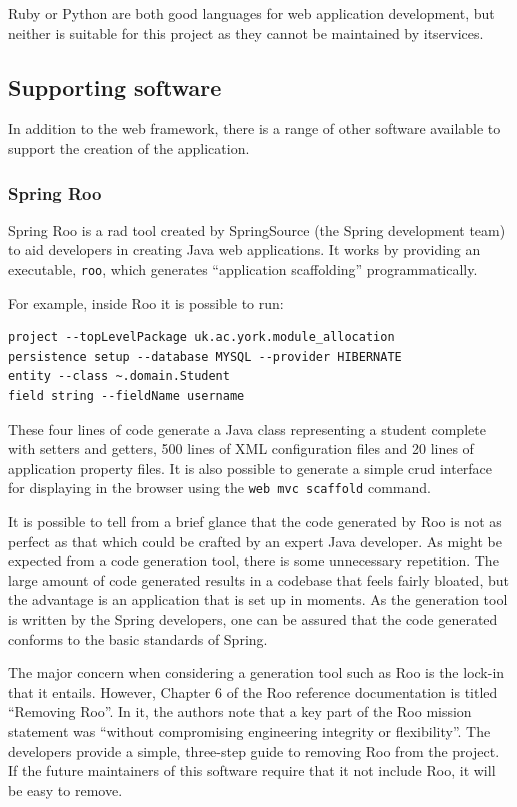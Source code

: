 \documentclass[twoside,draft]{scrartcl}
\begin{document}
Ruby or Python are both good languages for web application development, but
neither is suitable for this project as they cannot be maintained by
\gls{itservices}.

\subsection{Supporting software}

In addition to the web framework, there is a range of other software available
to support the creation of the application.

\subsubsection{Spring Roo}

Spring Roo is a \gls{rad} tool created by SpringSource (the Spring development team) to
aid developers in creating Java web applications. It works by providing an
executable, \texttt{roo}, which generates ``application scaffolding''
programmatically.

For example, inside Roo it is possible to run:

\begin{lstlisting}
project --topLevelPackage uk.ac.york.module_allocation
persistence setup --database MYSQL --provider HIBERNATE
entity --class ~.domain.Student
field string --fieldName username
\end{lstlisting}

These four lines of code generate a Java class representing a student complete
with setters and getters, 500 lines of XML configuration files and 20 lines of
application property files. It is also possible to generate a simple
\gls{crud} interface for displaying in the browser using the \texttt{web mvc
scaffold} command.

It is possible to tell from a brief glance that the code generated by Roo is
not as perfect as that which could be crafted by an expert Java developer. As
might be expected from a code generation tool, there is some unnecessary
repetition. The large amount of code generated results in a codebase that
feels fairly bloated, but the advantage is an application that is set up in
moments. As the generation tool is written by the Spring developers, one can
be assured that the code generated conforms to the basic standards of Spring.

The major concern when considering a generation tool such as Roo is the
lock-in that it entails. However, Chapter 6 of the Roo reference documentation
\cite{RooReferenceDocs2011} is titled ``Removing Roo''. In it, the authors
note that a key part of the Roo mission statement was ``without compromising
engineering integrity or flexibility''. The developers provide a simple,
three-step guide to removing Roo from the project. If the future maintainers
of this software require that it not include Roo, it will be easy to remove.
\end{document}
